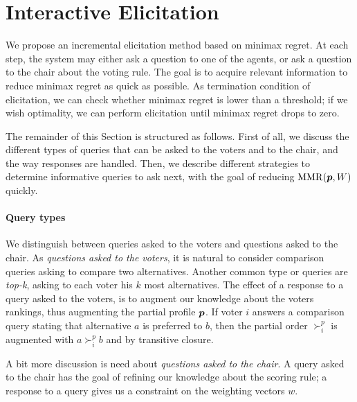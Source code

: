 \section{Interactive Elicitation} 
\label{sec:elicit}
We propose an incremental elicitation method based on minimax regret.
At each step, the system may either ask a question to one of the agents, or ask a question to the chair about the voting rule. 
The goal is to acquire relevant information to reduce minimax regret as quick as possible.
As termination condition of elicitation, we can check whether minimax regret is lower than a threshold; if we wish optimality, we can perform elicitation until minimax regret drops to zero.

The remainder of this Section is structured as follows.
First of all, we discuss the different types of queries that can be asked to the voters and to the chair, and the way responses are handled.
Then, we describe different strategies to determine informative queries to ask next, with the goal of reducing $\operatorname{MMR}({\bm{p}},W)$ quickly.


\paragraph{Query types}
We distinguish between queries asked to the voters and questions asked to the chair.
As {\em questions asked to the voters}, it is natural to consider comparison queries asking to compare two alternatives.
Another common type or queries are {\em top-k}, asking to each voter his $k$ most alternatives.
The effect of a response to a query asked to the voters, is to augment our knowledge about the voters rankings, thus augmenting the partial profile ${\bm{p}}$. 
If voter $i$ answers a comparison query stating that alternative $a$ is preferred to $b$, then the partial order $\succ^{p}_{i}$ is augmented with $a \succ^{p}_{i} b$ and by transitive closure.

A bit more discussion is need about {\em questions asked to the chair}.
A query asked to the chair has the goal of refining our knowledge about the scoring rule;
a response to a query gives us a constraint on the weighting vectors $w$.

